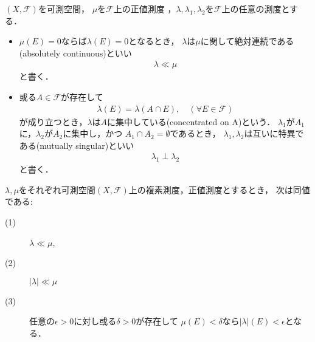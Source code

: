 	\begin{screen}
		\begin{dfn}[絶対連続・特異]
			$(X,\mathscr{F})$を可測空間，
			$\mu$を$\mathscr{F}$上の正値測度
			，$\lambda,\lambda_1,\lambda_2$を$\mathscr{F}$上の任意の測度とする．
			\begin{itemize}
				\item $\mu(E)=0$ならば$\lambda(E)=0$となるとき，
					$\lambda$は$\mu$に関して絶対連続である(absolutely continuous)といい
					\begin{align}
						\lambda \ll \mu
					\end{align}
					と書く．
				
				\item 或る$A \in \mathscr{F}$が存在して
					\begin{align}
						\lambda(E) = \lambda(A \cap E),\quad (\forall E \in \mathscr{F})
					\end{align}
					が成り立つとき，$\lambda$は$A$に集中している(concentrated on A)という．
					$\lambda_1$が$A_1$に，$\lambda_2$が$A_2$に集中し，かつ
					$A_1 \cap A_2 = \emptyset$であるとき，
					$\lambda_1,\lambda_2$は互いに特異である(mutually singular)といい
					\begin{align}
						\lambda_1 \perp \lambda_2
					\end{align}
					と書く．
			\end{itemize}
		\end{dfn}
	\end{screen}
	
	\begin{screen}
		\begin{thm}[絶対連続性の同値条件]\label{thm:equivalent_condition_of_absolute_continuity}
			$\lambda,\mu$をそれぞれ可測空間$(X,\mathscr{F})$上の複素測度，正値測度とするとき，
			次は同値である:
			\begin{description}
				\item[(1)] $\lambda \ll \mu$,
				\item[(2)] $|\lambda| \ll \mu$
				\item[(3)] 任意の$\epsilon > 0$に対し或る$\delta > 0$が存在して
					$\mu(E) < \delta$なら$|\lambda|(E) < \epsilon$となる．
			\end{description}
		\end{thm}
	\end{screen}
	
